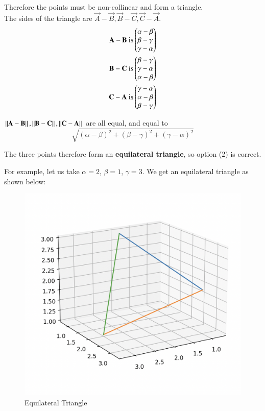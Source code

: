 \documentclass[12pt]{article}
\begin{document}
Therefore the points must be non-collinear and form a triangle.\\

The sides of the triangle are $\vec{A} - \vec{B}, \vec{B} - \vec{C}, \vec{C}- \vec{A}$.\\

\begin{align}
\mathbf{A-B} \text{ is} \begin{pmatrix}\alpha - \beta \\ \beta - \gamma \\ \gamma - \alpha\end{pmatrix} \\
\mathbf{B-C} \text{ is} \begin{pmatrix}\beta - \gamma \\ \gamma - \alpha \\ \alpha - \beta\end{pmatrix} \\
\mathbf{C-A} \text{ is} \begin{pmatrix}\gamma - \alpha \\ \alpha - \beta \\ \beta - \gamma\end{pmatrix}
\end{align}


$\left\lVert\mathbf{A}-\mathbf{B}\right\rVert, \left\lVert\mathbf{B}-\mathbf{C}\right\rVert, \left\lVert\mathbf{C}-\mathbf{A}\right\rVert$ are all equal, and equal to
$$\sqrt{(\alpha - \beta)^2  + (\beta - \gamma)^2 + (\gamma - \alpha)^2}$$

The three points therefore form an \textbf{equilateral triangle}, so option (2) is correct.

For example, let us take $\alpha = 2$, $\beta = 1$, $\gamma = 3$.
We get an equilateral triangle as shown below:

\begin{figure}[H]
    \centering
    \includegraphics[width=0.7\columnwidth]{Figs/Example.png}
    \caption{Equilateral Triangle}
    \label{fig:placeholder}
\end{figure}
\end{document}
